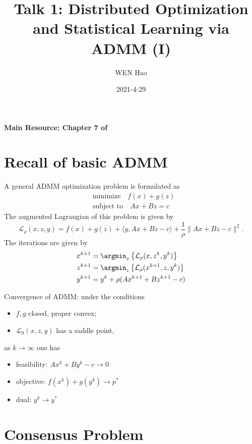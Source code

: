 
\usepackage{empheq}
\usepackage{cancel}



\title{Talk 1: Distributed Optimization and Statistical Learning via ADMM (I)}
\date{2021-4-29}
\author{WEN Hao}

\maketitle

{\bfseries Main Resource: Chapter 7 of \cite{boyd2011distributed}}

\section{Recall of basic ADMM}

A general ADMM optimization problem is formulated as
\begin{align*}
    & \text{minimize} \quad f(x) + g(z) \\
    & \text{subject to} \quad Ax + Bz = c
\end{align*}
The augmented Lagrangian of this problem is given by
$$\mathcal{L}_{\rho}(x,z,y) = f(x) + g(z) + \langle y, Ax+Bz-c \rangle + \dfrac{1}{\rho}\lVert Ax+Bz-c \rVert^2.$$
The iterations are given by
\begin{align*}
    x^{k+1} & = \argmin_{x} \left\{ \mathcal{L}_{\rho}(x,z^k,y^k) \right\} \\
    z^{k+1} & = \argmin_{z} \left\{ \mathcal{L}_{\rho}(x^{k+1},z,y^k) \right\} \\
    y^{k+1} & = y^{k} + \rho (Ax^{k+1}+Bz^{k+1}-c)
\end{align*}

Convergence of ADMM: under the conditions
\begin{itemize}
    \item $f,g$ closed, proper convex;
    \item $\mathcal{L}_{0}(x,z,y)$ has a saddle point,
\end{itemize}
as $k\rightarrow\infty$ one has
\begin{itemize}
    \item feasibility: $Ax^k + By^k - c \rightarrow 0$
    \item objective: $f(x^k) + g(y^k) \rightarrow p^*$
    \item dual: $y^k \rightarrow y^*$
\end{itemize}

\section{Consensus Problem}

